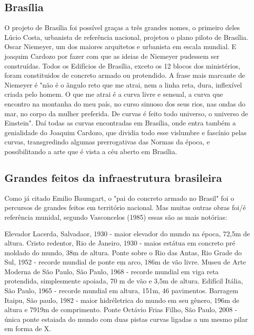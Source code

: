 \subsection{Brasília}

O projeto de Brasília foi possível graças a três grandes nomes, o primeiro deles Lúcio Costa, urbanista de referência nacional, projetou o plano piloto de Brasília. Oscar Niemeyer, um dos maiores arquitetos e urbanista em escala mundial. E joaquim Cardozo por fazer com que as ideias de Niemeyer pudessem ser construídas.
Todos os Edifícios de Brasília, exceto os 12 blocos dos ministérios, foram constituidos de concreto armado ou protendido. A frase mais marcante de Niemeyer é "não é o ângulo reto que me atrai, nem a linha reta, dura, inflexível criada pelo homem. O que me atrai é a curva livre e sensual, a curva que encontro na montanha do meu país, no curso sinuoso dos seus rios, nas ondas do mar, no corpo da mulher preferida. De curvas é feito todo universo, o universo de Einstein". Daí todas as curvas encontradas em Brasília, onde entra também a genialidade do Joaquim Cardozo, que dividia todo esse vislumbre e fascínio pelas curvas, transgredindo algumas prerrogativas das Normas da época, e possibilitando a arte que é vista a céu aberto em Brasília.

\subsection{Grandes feitos da infraestrutura brasileira}

Como já citado Emilio Baumgart, o "pai do concreto armado no Brasil" foi o percursos de grandes feitos em território nacional. Mas muitas outras obras foi/é referência munidal, segundo Vasconcelos (1985) essas são as mais notórias:

	Elevador Lacerda, Salvadaor, 1930 - maior elevador do mundo na época, 72,5m de altura.
	Cristo redentor, Rio de Janeiro, 1930 - maios estátua em concreto pré moldado do mundo, 38m de altura.
	Ponte sobre o Rio das Antas, Rio Grade do Sul, 1952 - recorde mundial de ponte em arco, 186m de vão livre.
	Museu de Arte Moderna de São Paulo, São Paulo, 1968 - recorde mundial em viga reta protendida, simplesmente apoiada, 70 m de vão e 3,5m de altura.
	Edifícil Itália, São Paulo, 1965 - recorde mundial em altura, 151m, 46 pavimentos.
	Barragem Itaipu, São paulo, 1982 - maior hidréletrica do mundo em seu gênero, 196m de altura e 7919m de comprimento.
	Ponte Octávio Frias Filho, São Paulo, 2008 - única ponte estaiada do mundo com duas pistas curvas ligadas a um mesmo pilar em forma de X.

